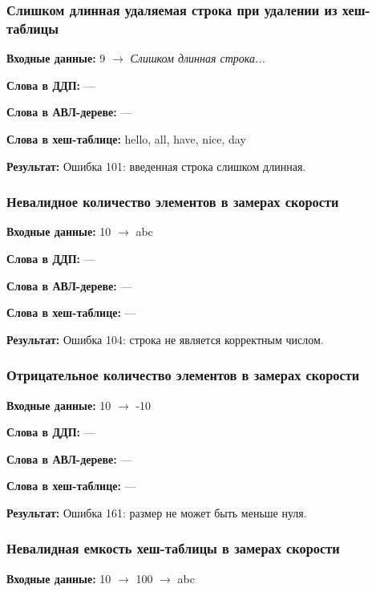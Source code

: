 \documentclass[a4paper,12pt]{extarticle}
\begin{document}

\subsubsection{Слишком длинная удаляемая строка при удалении из хеш-таблицы}

\textbf{Входные данные: }
9 $\rightarrow$ \textit{Слишком длинная строка...}

\textbf{Слова в ДДП: }
---

\textbf{Слова в АВЛ-дереве: }
---

\textbf{Слова в хеш-таблице: }
hello, all, have, nice, day

\textbf{Результат: }
Ошибка 101: введенная строка слишком длинная.


\subsubsection{Невалидное количество элементов в замерах скорости}

\textbf{Входные данные: }
10 $\rightarrow$ abc

\textbf{Слова в ДДП: }
---

\textbf{Слова в АВЛ-дереве: }
---

\textbf{Слова в хеш-таблице: }
---

\textbf{Результат: }
Ошибка 104: строка не является корректным числом.


\subsubsection{Отрицательное количество элементов в замерах скорости}

\textbf{Входные данные: }
10 $\rightarrow$ -10

\textbf{Слова в ДДП: }
---

\textbf{Слова в АВЛ-дереве: }
---

\textbf{Слова в хеш-таблице: }
---

\textbf{Результат: }
Ошибка 161: размер не может быть меньше нуля.


\subsubsection{Невалидная емкость хеш-таблицы в замерах скорости}

\textbf{Входные данные: }
10 $\rightarrow$ 100 $\rightarrow$ abc
\end{document}
